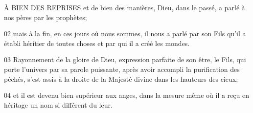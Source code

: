 À BIEN DES REPRISES et de bien des manières, Dieu, dans le passé, a parlé à nos pères par les prophètes;

02 mais à la fin, en ces jours où nous sommes, il nous a parlé par son Fils qu’il a établi héritier de toutes choses et par qui il a créé les mondes.

03 Rayonnement de la gloire de Dieu, expression parfaite de son être, le Fils, qui porte l’univers par sa parole puissante, après avoir accompli la purification des péchés, s’est assis à la droite de la Majesté divine dans les hauteurs des cieux;

04 et il est devenu bien supérieur aux anges, dans la mesure même où il a reçu en héritage un nom si différent du leur.
